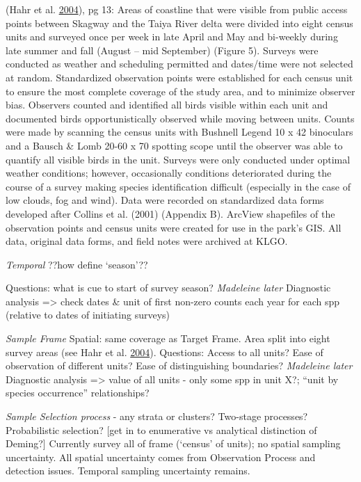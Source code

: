 \documentclass[]{article}
\begin{document}
(Hahr et al. \protect\hyperlink{ref-Hahr2004}{2004}), pg 13: Areas of
coastline that were visible from public access points between Skagway
and the Taiya River delta were divided into eight census units and
surveyed once per week in late April and May and bi-weekly during late
summer and fall (August -- mid September) (Figure 5). Surveys were
conducted as weather and scheduling permitted and dates/time were not
selected at random. Standardized observation points were established for
each census unit to ensure the most complete coverage of the study area,
and to minimize observer bias. Observers counted and identified all
birds visible within each unit and documented birds opportunistically
observed while moving between units. Counts were made by scanning the
census units with Bushnell Legend 10 x 42 binoculars and a Bausch \&
Lomb 20-60 x 70 spotting scope until the observer was able to quantify
all visible birds in the unit. Surveys were only conducted under optimal
weather conditions; however, occasionally conditions deteriorated during
the course of a survey making species identification difficult
(especially in the case of low clouds, fog and wind). Data were recorded
on standardized data forms developed after Collins et al. (2001)
(Appendix B). ArcView shapefiles of the observation points and census
units were created for use in the park's GIS. All data, original data
forms, and field notes were archived at KLGO.

\emph{Temporal} ??how define `season'??

Questions: what is cue to start of survey season? \emph{Madeleine later}
Diagnostic analysis =\textgreater{} check dates \& unit of first
non-zero counts each year for each spp (relative to dates of initiating
surveys)

\emph{Sample Frame} Spatial: same coverage as Target Frame. Area split
into eight survey areas (see Hahr et al.
\protect\hyperlink{ref-Hahr2004}{2004}). Questions: Access to all units?
Ease of observation of different units? Ease of distinguishing
boundaries? \emph{Madeleine later} Diagnostic analysis =\textgreater{}
value of all units - only some spp in unit X?; ``unit by species
occurrence'' relationships?

\emph{Sample Selection process} - any strata or clusters? Two-stage
processes? Probabilistic selection? {[}get in to enumerative vs
analytical distinction of Deming?{]} Currently survey all of frame
(`census' of units); no spatial sampling uncertainty. All spatial
uncertainty comes from Observation Process and detection issues.
Temporal sampling uncertainty remains.
\end{document}
